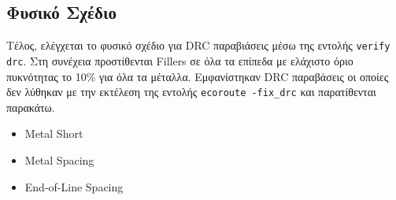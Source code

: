\subsection{Φυσικό Σχέδιο}

Τέλος, ελέγχεται το φυσικό σχέδιο για DRC παραβιάσεις μέσω της εντολής \texttt{verify drc}.
Στη συνέχεια προστίθενται Fillers σε όλα τα επίπεδα με ελάχιστο όριο πυκνότητας το 10\% για όλα τα μέταλλα.
Εμφανίστηκαν DRC παραβάσεις οι οποίες δεν λύθηκαν με την εκτέλεση της εντολής \texttt{ecoroute -fix\_drc} και παρατίθενται παρακάτω.
\begin{itemize}
    \item Metal Short
    \item Metal Spacing
    \item End-of-Line Spacing
\end{itemize}
